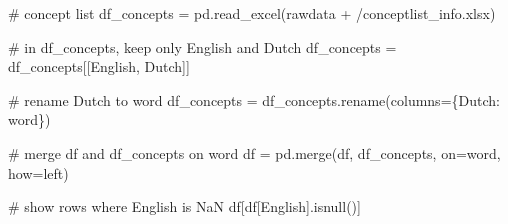 \documentclass[
  letterpaper,
  DIV=11,
  numbers=noendperiod]{scrreprt}
\newenvironment{Shaded}{\begin{snugshade}}{\end{snugshade}}
\newcommand{\CommentTok}[1]{\textcolor[rgb]{0.37,0.37,0.37}{#1}}
\newcommand{\NormalTok}[1]{\textcolor[rgb]{0.00,0.23,0.31}{#1}}
\newcommand{\OperatorTok}[1]{\textcolor[rgb]{0.37,0.37,0.37}{#1}}
\newcommand{\StringTok}[1]{\textcolor[rgb]{0.13,0.47,0.30}{#1}}
\begin{document}
\begin{Shaded}
\begin{Highlighting}[]
\CommentTok{\# concept list}
\NormalTok{df\_concepts }\OperatorTok{=}\NormalTok{ pd.read\_excel(rawdata }\OperatorTok{+} \StringTok{\textquotesingle{}/conceptlist\_info.xlsx\textquotesingle{}}\NormalTok{)}

\CommentTok{\# in df\_concepts, keep only English and Dutch}
\NormalTok{df\_concepts }\OperatorTok{=}\NormalTok{ df\_concepts[[}\StringTok{\textquotesingle{}English\textquotesingle{}}\NormalTok{, }\StringTok{\textquotesingle{}Dutch\textquotesingle{}}\NormalTok{]]}

\CommentTok{\# rename Dutch to word}
\NormalTok{df\_concepts }\OperatorTok{=}\NormalTok{ df\_concepts.rename(columns}\OperatorTok{=}\NormalTok{\{}\StringTok{\textquotesingle{}Dutch\textquotesingle{}}\NormalTok{: }\StringTok{\textquotesingle{}word\textquotesingle{}}\NormalTok{\})}

\CommentTok{\# merge df and df\_concepts on word}
\NormalTok{df }\OperatorTok{=}\NormalTok{ pd.merge(df, df\_concepts, on}\OperatorTok{=}\StringTok{\textquotesingle{}word\textquotesingle{}}\NormalTok{, how}\OperatorTok{=}\StringTok{\textquotesingle{}left\textquotesingle{}}\NormalTok{)}

\CommentTok{\# show rows where English is NaN}
\NormalTok{df[df[}\StringTok{\textquotesingle{}English\textquotesingle{}}\NormalTok{].isnull()]}


\end{Highlighting}
\end{Shaded}
\end{document}
